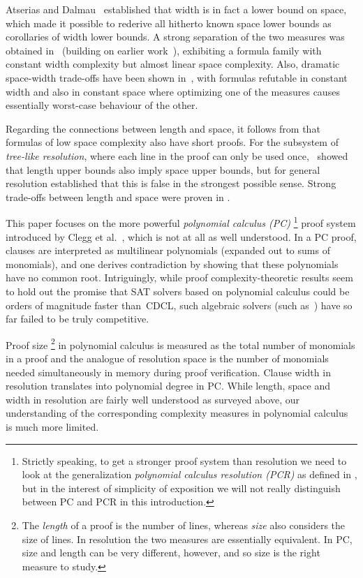 \documentclass[11pt]{article}
\makeatletter
\numberwithin{equation}{section}
\theoremstyle{definition}
\theoremstyle{plain}
\theoremstyle{plain}
\theoremstyle{definition}
\newcommand{\introduceterm}[1]{{\emph{#1}}}
\newcommand{\etal}{et al.\@\xspace}
\makeatother
\begin{document}
Atserias and Dalmau~%
\cite{AD08CombinatoricalCharacterization}
established that %
width
is in fact
%
%
%
a lower bound on space, %
which made it possible
to rederive all hitherto known space lower bounds as corollaries of
width lower bounds.
%
A strong separation of the two measures
%
was obtained in~%
\cite{BN08ShortProofs}
(building on earlier 
work~\cite{Nordstrom09NarrowProofsSICOMP,NH13TowardsOptimalSeparation}),
exhibiting a formula family
with constant width complexity but almost
linear space complexity. 
%
Also, dramatic space-width trade-offs have been shown
in~\cite{Ben-Sasson09SizeSpaceTradeoffs}, 
with formulas refutable in constant width and
also in  %
constant space
%
where optimizing one of the
measures causes essentially worst-case behaviour of the 
other.
%

Regarding the connections between length and space,
it follows from
\cite{AD08CombinatoricalCharacterization}
that formulas of low space complexity also have short proofs.
For the subsystem of \introduceterm{tree-like resolution},
where each line in the proof can only be used once,
\cite{ET01SpaceBounds}~showed 
%
that length upper bounds also imply space upper bounds,
but for general resolution
\cite{BN08ShortProofs} established that this is false in the
strongest possible sense. 
%
Strong trade-offs between length and space were proven in
\cite{BN11UnderstandingSpace,BBI16TimeSpace}.

This paper focuses on the more powerful
%
\introduceterm{polynomial calculus (PC)}%
\footnote{Strictly speaking, to get a stronger proof system than
  resolution we need to look at the generalization
%
%
  \introduceterm{polynomial calculus resolution (PCR)} 
  as defined in
  \cite{ABRW02SpaceComplexity},
%
%
  but in the interest of simplicity of exposition we will not really
  distinguish between PC and PCR in this introduction.
}
proof system introduced by Clegg \etal~\cite{CEI96Groebner},
which is not at all as well understood.
In a PC proof, clauses are interpreted as multilinear polynomials
(expanded out to sums of monomials),
and one derives contradiction by showing that these polynomials have
no common root. 
%
Intriguingly, while proof complexity-theoretic results seem to hold
out the promise that SAT solvers based on 
%
%
polynomial calculus could be orders of
magnitude faster than~CDCL, such algebraic solvers 
%
(such as~\cite{BD09Polybori})
have so far failed to be truly competitive.

Proof size%
\footnote{The \introduceterm{length} of a proof is the
  number of lines, whereas \introduceterm{size} also   considers 
  the size of lines. In resolution the two measures are
  essentially equivalent. In PC, %
  size and length can be
  very different, however, and so size is the right measure to study.}
in 
%
polynomial calculus   
is measured as the total number of monomials in a proof
and the analogue of resolution space is the number of monomials needed 
%
simultaneously in memory during
proof verification. Clause width in resolution
translates into polynomial degree in PC.
While length, space and width in resolution are fairly well
understood as surveyed above,
our understanding of the corresponding
complexity measures in 
%
polynomial calculus is much more limited.
\end{document}

